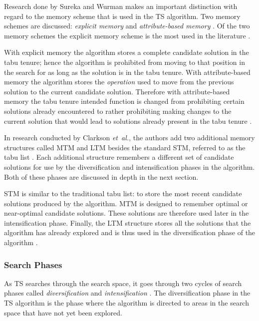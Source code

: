 Research done by Sureka and  Wurman\cite{TabuBiddingStrats,TabuFormGames} makes an important distinction with regard to the memory scheme that is used in the \gls{TS} algorithm. Two memory schemes are discussed: \emph{explicit memory} and \emph{attribute-based memory} \cite{TabuBiddingStrats,TabuFormGames}. Of the two memory schemes the explicit memory scheme is the most used in the literature \cite{TabuVechicleRoutingWithTimeWindows}.

With explicit memory the algorithm stores a complete candidate solution in the tabu tenure; hence the algorithm is prohibited from moving to that position in the search for as long as the solution is in the tabu tenure\cite{TabuBiddingStrats,TabuFormGames}. With attribute-based memory the algorithm stores the \emph{operation} used to move from the previous solution to the current candidate solution\cite{TabuBiddingStrats,TabuFormGames}. Therefore with attribute-based memory the tabu tenure intended function is changed from prohibiting certain solutions already encountered to rather prohibiting making changes to the current solution that would lead to solutions already present in the tabu tenure \cite{TabuBiddingStrats,TabuFormGames}.

In research conducted by Clarkson \emph{et\ al.}\cite{MultiObjTabu}, the authors add two additional memory structures called \gls{MTM} and \gls{LTM} besides the standard \gls{STM}, referred to as the tabu list \cite{MultiObjTabu}. Each additional structure remembers a different set of candidate solutions for use by the diversification and intensification phases in the algorithm. Both of these phases are discussed in depth in the next section.

STM is similar to the traditional tabu list: to store the most recent candidate solutions produced by the algorithm. \gls{MTM} is designed to remember optimal or near-optimal candidate solutions. These solutions are therefore used later in the intensification phase. Finally, the \gls{LTM} structure stores all the solutions that the algorithm has already explored and is thus used in the diversification phase of the algorithm \cite{MultiObjTabu}.

\subsubsection{Search Phases}
\label{TSSearchPhases}
As \gls{TS} searches through the search space, it goes through two cycles of search phases called \emph{diversification} and \emph{intensification} \cite{TabuParameterization,TabuCrewSchedulingProblem,NonlinearGlobalTabu,SelfControllingReactiveTabu}. The diversification phase in the \gls{TS} algorithm is the phase where the algorithm is directed to areas in the search space that have not yet been explored\cite{ReactiveTabuVHR,SelfControllingReactiveTabu}.

